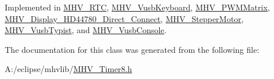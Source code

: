 \-Implemented in \hyperlink{class_m_h_v___r_t_c_a949570f89977560cc68dc909e7d0a805}{\-M\-H\-V\-\_\-\-R\-T\-C}, \hyperlink{class_m_h_v___vusb_keyboard_a9d59ac54f1b17ece17c038dc3f5bd026}{\-M\-H\-V\-\_\-\-Vusb\-Keyboard}, \hyperlink{class_m_h_v___p_w_m_matrix_a15a8c45e7736a53cb2e19a7c2070bb0d}{\-M\-H\-V\-\_\-\-P\-W\-M\-Matrix}, \hyperlink{class_m_h_v___display___h_d44780___direct___connect_afde566730348a32f1699e92d2e887240}{\-M\-H\-V\-\_\-\-Display\-\_\-\-H\-D44780\-\_\-\-Direct\-\_\-\-Connect}, \hyperlink{class_m_h_v___stepper_motor_a97826114693f3e3d3ada782ee0e35b22}{\-M\-H\-V\-\_\-\-Stepper\-Motor}, \hyperlink{class_m_h_v___vusb_typist_a90c805aafa38fb78df184c26fd4e0967}{\-M\-H\-V\-\_\-\-Vusb\-Typist}, and \hyperlink{class_m_h_v___vusb_console_af2e1ca4fd0700cc6692807b9bcc5e227}{\-M\-H\-V\-\_\-\-Vusb\-Console}.



\-The documentation for this class was generated from the following file\-:\begin{DoxyCompactItemize}
\item 
\-A\-:/eclipse/mhvlib/\hyperlink{_m_h_v___timer8_8h}{\-M\-H\-V\-\_\-\-Timer8.\-h}\end{DoxyCompactItemize}
